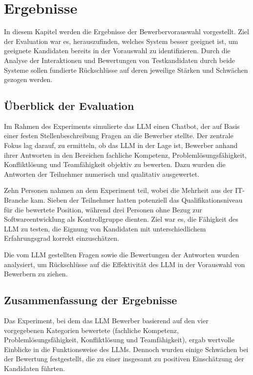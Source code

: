 
\chapter{Ergebnisse}

In diesem Kapitel werden die Ergebnisse der Bewerbervorauswahl vorgestellt. Ziel der Evaluation war es, herauszufinden, welches System besser geeignet ist, um geeignete Kandidaten bereits in der Vorauswahl zu identifizieren. Durch die Analyse der Interaktionen und Bewertungen von Testkandidaten durch beide Systeme sollen fundierte Rückschlüsse auf deren jeweilige Stärken und Schwächen gezogen werden.

\section{Überblick der Evaluation}

Im Rahmen des Experiments simulierte das LLM einen Chatbot, der auf Basis einer festen Stellenbeschreibung Fragen an die Bewerber stellte. Der zentrale Fokus lag darauf, zu ermitteln, ob das LLM in der Lage ist, Bewerber anhand ihrer Antworten in den Bereichen fachliche Kompetenz, Problemlösungsfähigkeit, Konfliktlösung und Teamfähigkeit objektiv zu bewerten. Dazu wurden die Antworten der Teilnehmer numerisch und qualitativ ausgewertet.

Zehn Personen nahmen an dem Experiment teil, wobei die Mehrheit aus der IT-Branche kam. Sieben der Teilnehmer hatten potenziell das Qualifikationsniveau für die bewertete Position, während drei Personen ohne Bezug zur Softwareentwicklung als Kontrollgruppe dienten. Ziel war es, die Fähigkeit des LLM zu testen, die Eignung von Kandidaten mit unterschiedlichem Erfahrungsgrad korrekt einzuschätzen.

Die vom LLM gestellten Fragen sowie die Bewertungen der Antworten wurden analysiert, um Rückschlüsse auf die Effektivität des LLM in der Vorauswahl von Bewerbern zu ziehen.

\section{Zusammenfassung der Ergebnisse}

Das Experiment, bei dem das LLM Bewerber basierend auf den vier vorgegebenen Kategorien bewertete (fachliche Kompetenz, Problemlösungsfähigkeit, Konfliktlösung und Teamfähigkeit), ergab wertvolle Einblicke in die Funktionsweise des LLMs. Dennoch wurden einige Schwächen bei der Bewertung festgestellt, die zu einer insgesamt zu positiven Einschätzung der Kandidaten führten.

